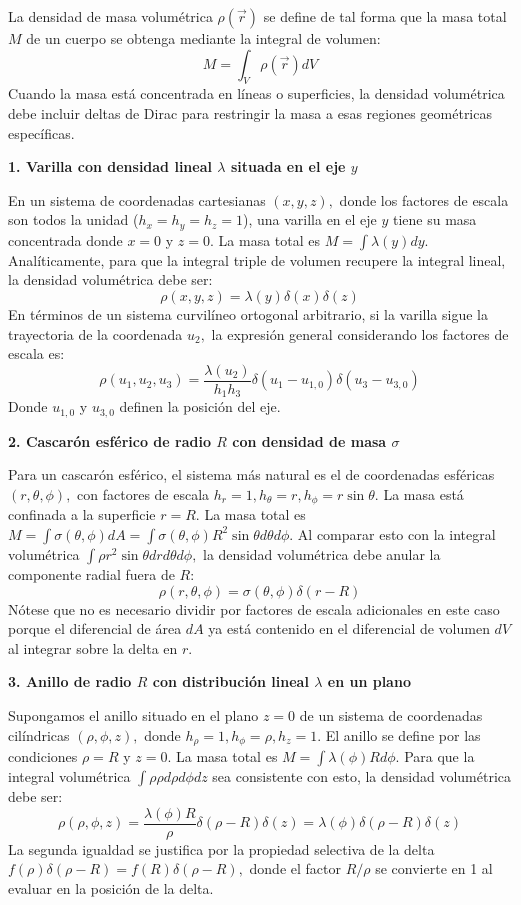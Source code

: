 \documentclass[a4paper]{article}
\begin{document}
La densidad de masa volumétrica $\rho(\vec{r})$ se define de tal forma que la masa total $M$ de un cuerpo se obtenga mediante la integral de volumen:
$$ M = \int_V \rho(\vec{r}) dV $$
Cuando la masa está concentrada en líneas o superficies, la densidad volumétrica debe incluir deltas de Dirac para restringir la masa a esas regiones geométricas específicas.

\textbf{1. Varilla con densidad lineal $\lambda$ situada en el eje $y$}

En un sistema de coordenadas cartesianas $(x, y, z),$ donde los factores de escala son todos la unidad ($h_x=h_y=h_z=1$), una varilla en el eje $y$ tiene su masa concentrada donde $x=0$ y $z=0.$ La masa total es $M = \int \lambda(y) dy.$
Analíticamente, para que la integral triple de volumen recupere la integral lineal, la densidad volumétrica debe ser:
$$ \rho(x, y, z) = \lambda(y) \delta(x) \delta(z) $$
En términos de un sistema curvilíneo ortogonal arbitrario, si la varilla sigue la trayectoria de la coordenada $u_2,$ la expresión general considerando los factores de escala es:
$$ \rho(u_1, u_2, u_3) = \frac{\lambda(u_2)}{h_1 h_3} \delta(u_1 - u_{1,0}) \delta(u_3 - u_{3,0}) $$
Donde $u_{1,0}$ y $u_{3,0}$ definen la posición del eje.

\textbf{2. Cascarón esférico de radio $R$ con densidad de masa $\sigma$}

Para un cascarón esférico, el sistema más natural es el de coordenadas esféricas $(r, \theta, \phi),$ con factores de escala $h_r = 1, h_\theta = r, h_\phi = r \sin \theta.$ La masa está confinada a la superficie $r = R.$
La masa total es $M = \int \sigma(\theta, \phi) dA = \int \sigma(\theta, \phi) R^2 \sin \theta d\theta d\phi.$ Al comparar esto con la integral volumétrica $\int \rho r^2 \sin \theta dr d\theta d\phi,$ la densidad volumétrica debe anular la componente radial fuera de $R$:
$$ \rho(r, \theta, \phi) = \sigma(\theta, \phi) \delta(r - R) $$
Nótese que no es necesario dividir por factores de escala adicionales en este caso porque el diferencial de área $dA$ ya está contenido en el diferencial de volumen $dV$ al integrar sobre la delta en $r.$

\textbf{3. Anillo de radio $R$ con distribución lineal $\lambda$ en un plano}

Supongamos el anillo situado en el plano $z = 0$ de un sistema de coordenadas cilíndricas $(\rho, \phi, z),$ donde $h_\rho = 1, h_\phi = \rho, h_z = 1.$ El anillo se define por las condiciones $\rho = R$ y $z = 0.$
La masa total es $M = \int \lambda(\phi) R d\phi.$ Para que la integral volumétrica $\int \rho \rho d\rho d\phi dz$ sea consistente con esto, la densidad volumétrica debe ser:
$$ \rho(\rho, \phi, z) = \frac{\lambda(\phi) R}{\rho} \delta(\rho - R) \delta(z) = \lambda(\phi) \delta(\rho - R) \delta(z) $$
La segunda igualdad se justifica por la propiedad selectiva de la delta $f(\rho)\delta(\rho - R) = f(R)\delta(\rho - R),$ donde el factor $R/\rho$ se convierte en 1 al evaluar en la posición de la delta.
\end{document}
